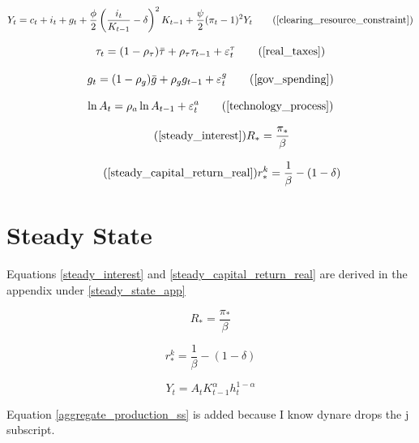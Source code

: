 \documentclass[11pt,preprint]{elsarticle}
\numberwithin{equation}{section}
\numberwithin{figure}{section}
\numberwithin{table}{section}
\begin{document}
\begin{equation}
   Y_t = c_t + i_t + g_t + \frac{\phi}{2} \left( \frac{i_t}{K_{t-1}} - \delta \right)^2 K_{t-1} + \frac{\psi}{2} (\pi_t - 1)^2 Y_t
\tag{\ref{clearing_resource_constraint}}
\end{equation}

\begin{equation}
\tau_t = (1-\rho_\tau)\bar{\tau} + \rho_\tau \tau_{t-1} + \varepsilon_t^\tau 
\tag{\ref{real_taxes}}
\end{equation}

\begin{equation}
g_t = (1-\rho_g)\bar{g} + \rho_g g_{t-1} + \varepsilon_t^g 
\tag{\ref{gov_spending}}
\end{equation}

\begin{equation}
\ln A_t = \rho_a \ln A_{t-1} + \varepsilon_t^a 
\tag{\ref{technology_process}}
\end{equation}

\begin{equation} 
\tag{\ref{steady_interest}}
R_* = \frac{\pi_*}{\beta}
\end{equation}

\begin{equation}
\tag{\ref{steady_capital_return_real}}
r^k_* = \frac{1}{\beta} - (1-\delta)
\end{equation}

\section{Steady State}\label{steady-state}

Equations \eqref{steady_interest} and \eqref{steady_capital_return_real}
are derived in the appendix under \ref{steady_state_app}

\begin{equation} \label{steady_interest}
R_* = \frac{\pi_*}{\beta}
\end{equation}

\begin{equation}
\label{steady_capital_return_real}
r^k_* = \frac{1}{\beta} - (1-\delta)
\end{equation}

\begin{equation}
Y_t = A_t K_{t-1}^\alpha h_t^{1-\alpha}
\label{aggregate_production_ss}
\end{equation}

Equation \eqref{aggregate_production_ss} is added because I know dynare
drops the j subscript.
\end{document}
